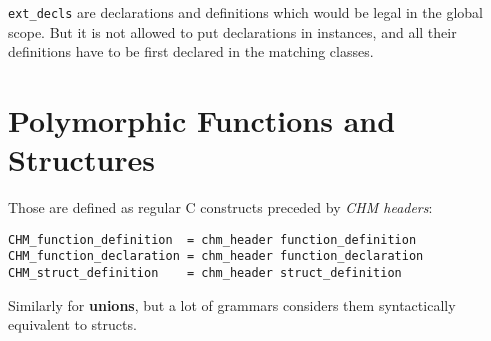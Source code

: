 \lstinline{ext_decls} are declarations and definitions which would be legal in the global scope. But it is not allowed to put declarations in instances, and all their definitions have to be first declared in the matching classes.

\section{Polymorphic Functions and Structures}

Those are defined as regular C constructs preceded by \emph{CHM headers}:

\begin{lstlisting}
CHM_function_definition  = chm_header function_definition
CHM_function_declaration = chm_header function_declaration
CHM_struct_definition    = chm_header struct_definition
\end{lstlisting}

Similarly for \textbf{unions}, but a lot of grammars considers them syntactically equivalent to structs.
